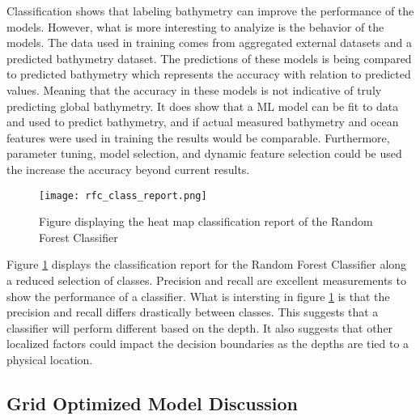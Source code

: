 \par
Classification shows that labeling bathymetry can improve the performance of the models.
However, what is more interesting to analyize is the behavior of the models.
The data used in training comes from aggregated external datasets and a predicted bathymetry dataset.
The predictions of these models is being compared to predicted bathymetry which represents the accuracy with relation to predicted values.
Meaning that the accuracy in these models is not indicative of truly predicting global bathymetry.
It does show that a \ac{ML} model can be fit to data and used to predict bathymetry, and if actual measured bathymetry and ocean features were used in training the results would be comparable.
Furthermore, parameter tuning, model selection, and dynamic feature selection could be used the increase the accuracy beyond current results.

\begin{figure}[hb]
    \centering
    \texttt{[image: rfc\_class\_report.png]}
    \caption{Figure displaying the heat map classification report of the Random Forest Classifier}
    \label{fig:rfc_report}
\end{figure}

\par
Figure \ref{fig:rfc_report} displays the classification report for the Random Forest Classifier along a reduced selection of classes.
Precision and recall are excellent measurements to show the performance of a classifier.
What is intersting in figure \ref{fig:rfc_report} is that the precision and recall differs drastically between classes.
This suggests that a classifier will perform different based on the depth.
It also suggests that other localized factors could impact the decision boundaries as the depths are tied to a physical location.

\subsection{Grid Optimized Model Discussion}


